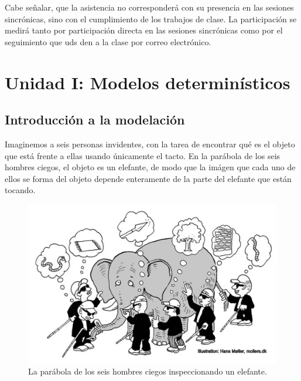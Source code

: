 \documentclass[
]{book}
\begin{document}
Cabe señalar, que la asistencia no corresponderá con su presencia en las sesiones sincrónicas, sino con el cumplimiento de los trabajos de clase. La participación se medirá tanto por participación directa en las sesiones sincrónicas como por el seguimiento que uds den a la clase por correo electrónico.

\hypertarget{unidad-i-modelos-determinuxedsticos}{%
\chapter{Unidad I: Modelos determinísticos}\label{unidad-i-modelos-determinuxedsticos}}

\hypertarget{introducciuxf3n-a-la-modelaciuxf3n}{%
\section{Introducción a la modelación}\label{introducciuxf3n-a-la-modelaciuxf3n}}

Imaginemos a seis personas invidentes, con la tarea de encontrar qué es el objeto que está frente a ellas usando únicamente el tacto. En la parábola de los seis hombres ciegos, el objeto es un elefante, de modo que la imágen que cada uno de ellos se forma del objeto depende enteramente de la parte del elefante que están tocando.

\begin{figure}

{\centering \includegraphics[width=16.17in]{Unidad-I/elefante} 

}

\caption{La parábola de los seis hombres ciegos inspeccionando un elefante.}\label{fig:unnamed-chunk-6}
\end{figure}
\end{document}
